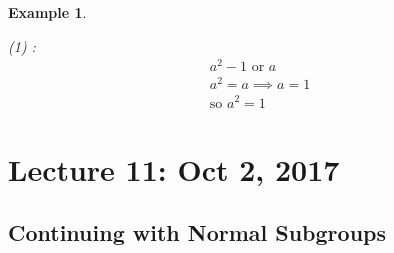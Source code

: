 \documentclass[11pt, oneside]{book}
\theoremstyle{break}
\newtheorem{eg}{Example}[section]
\begin{document}
\begin{eg}
\begin{enumerate}
            (1) :
            \begin{gather*}
                a^2 - 1 \text{ or } a \\
                a^2 = a \implies a = 1 \\
                \text{so } a^2 = 1
            \end{gather*}

    \end{enumerate}
\end{eg}

\chapter{Lecture 11: Oct 2, 2017}\label{chp:lec11}

\section{Continuing with Normal Subgroups}\label{sect:normal subgroups cont 3}
\end{document}
